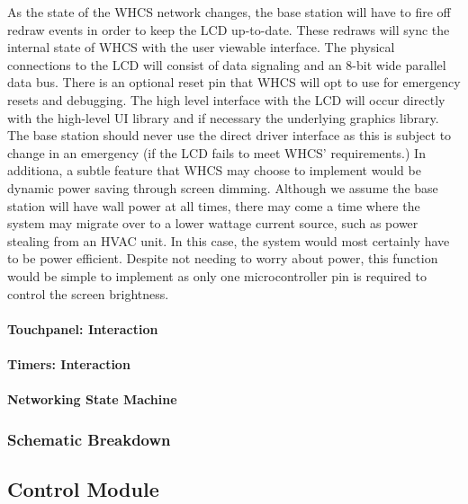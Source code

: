 As the state of the WHCS network changes, the base station will have to fire
off redraw events in order to keep the LCD up-to-date. These redraws will sync
the internal state of WHCS with the user viewable interface. The physical
connections to the LCD will consist of data signaling and an 8-bit wide
parallel data bus. There is an optional reset pin that WHCS will opt to use for
emergency resets and debugging. The high level interface with the LCD will
occur directly with the high-level UI library and if necessary the underlying
graphics library. The base station should never use the direct driver interface
as this is subject to change in an emergency (if the LCD fails to meet WHCS'
requirements.) In additiona, a subtle feature that WHCS may choose to implement would be
dynamic power saving through screen dimming. Although we assume the base
station will have wall power at all times, there may come a time where the
system may migrate over to a lower wattage current source, such as power
stealing from an HVAC unit. In this case, the system would most certainly have
to be power efficient. Despite not needing to worry about power, this function
would be simple to implement as only one microcontroller pin is required to
control the screen brightness.

\paragraph{Touchpanel: Interaction}

\paragraph{Timers: Interaction}

\paragraph{Networking State Machine}

\subsubsection{Schematic Breakdown}


\subsection{Control Module}

